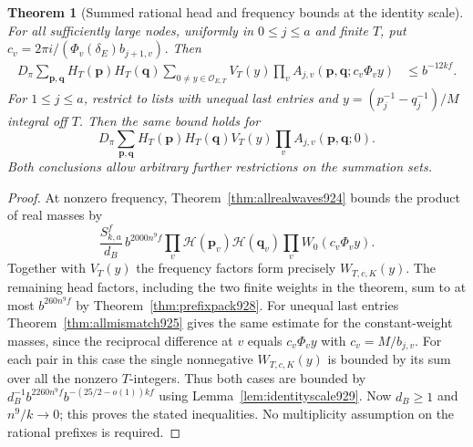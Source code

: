 \documentclass[a4paper,11pt]{article}
\newtheorem{theorem}[proposition]{Theorem}
\theoremstyle{definition}
\theoremstyle{remark}
\numberwithin{equation}{section}
\begin{document}
\begin{theorem}[Summed rational head and frequency bounds at the identity scale]
\leavevmode\label{thm:identityfrequency929}
For all sufficiently large nodes, uniformly in \(0\le j\le a\)
and finite \(T\), put \(c_v=2\pi i/(\Phi_v(\delta_E)b_{j+1,v})\).
Then
\begin{align}
 D_\pi \sum_{\mathbf p,\mathbf q} H_T(\mathbf p)H_T(\mathbf q)
     \sum_{0\ne y\in\mathcal O_{E,T}} V_T(y)
              \prod_v A_{j,v}(\mathbf p,\mathbf q;c_v\Phi_v y)
       &\le b^{-12kf}.
 \label{eq:identityfrequency929}
\end{align}
For \(1\le j\le a\), restrict to lists with unequal last entries
and \(y=(p_j^{-1}-q_j^{-1})/M\) integral off \(T\). Then the
same bound holds for
\[
 D_\pi\sum_{\mathbf p,\mathbf q} H_T(\mathbf p)H_T(\mathbf q)
                    V_T(y)\prod_v A_{j,v}(\mathbf p,\mathbf q;0).
\]
Both conclusions allow arbitrary further restrictions on the
summation sets.
\end{theorem}
\begin{proof}
At nonzero frequency,
Theorem~\ref{thm:allrealwaves924} bounds the product of real
masses by
\[
 \frac{S_{k,a}^f}{d_B}\,b^{2000n^9 f}
   \prod_v\mathcal H(\mathbf p_v)\mathcal H(\mathbf q_v)
              \prod_v W_0(c_v\Phi_v y).
\]
Together with \(V_T(y)\) the frequency factors form precisely
\(W_{T,c,K}(y)\). The remaining head factors, including the
two finite weights in the theorem, sum to at most \(b^{260n^9f}\)
by Theorem~\ref{thm:prefixpack928}. For unequal last entries
Theorem~\ref{thm:allmismatch925} gives the same estimate for
the constant-weight masses, since the reciprocal difference at
\(v\) equals \(c_v\Phi_v y\) with \(c_v=M/b_{j,v}\). For each
pair in this case the single nonnegative \(W_{T,c,K}(y)\) is
bounded by its sum over all the nonzero \(T\)-integers. Thus
both cases are bounded by
\(d_B^{-1}b^{2260 n^9 f}b^{-(25/2-o(1))kf}\)
using Lemma~\ref{lem:identityscale929}. Now \(d_B\ge1\) and
\(n^9/k\to0\); this proves the stated inequalities. No
multiplicity assumption on the rational prefixes is required.
\end{proof}
\end{document}
